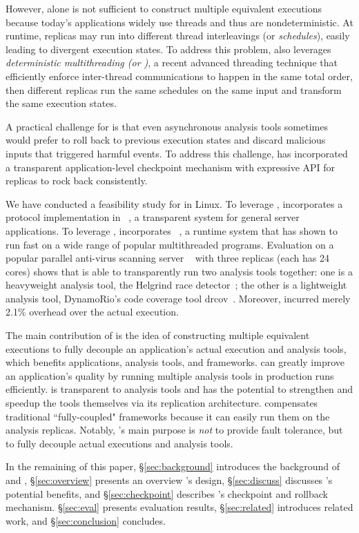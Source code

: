 However, \smr alone is not sufficient to construct multiple equivalent 
executions because today's applications widely use threads and thus are 
nondeterministic. At runtime, replicas may run into different thread
interleavings (or \emph{schedules}), easily leading to divergent execution
states. To address this problem, \xxx also leverages \emph{deterministic
multithreading (or \dmt)}, a recent advanced threading technique that
efficiently enforce inter-thread communications to happen in the same total
order, then different replicas run the same schedules on the same input and
transform the same execution states.


A practical challenge for \xxx is that even asynchronous analysis tools
sometimes would prefer to roll back to previous execution states and discard 
malicious inputs that triggered harmful events. To address this challenge, \xxx 
has incorporated a transparent application-level checkpoint mechanism with 
expressive API for replicas to rock back consistently.


We have conducted a feasibility study for \xxx in Linux. To leverage \smr, \xxx 
incorporates a \paxos protocol implementation in \repbox~\cite{repbox:sosp15}, 
a transparent \smr system for general server applications. To leverage \dmt, 
\xxx incorporates \parrot~\cite{parrot:sosp13}, a \dmt runtime system that has 
shown to run fast on a wide range of popular multithreaded programs. Evaluation 
on a popular parallel anti-virus scanning server \clamav~\cite{clamav} with 
three replicas (each has 24 cores) shows that \xxx is able to transparently run 
two analysis tools together: one is a heavyweight analysis tool, the Helgrind 
race detector~\cite{valgrind:pldi}; the other is a lightweight analysis tool, 
DynamoRio's code coverage tool drcov~\cite{dynamorio}. Moreover, \xxx incurred 
merely 2.1\% overhead over the actual execution.


The main contribution of \xxx is the idea of constructing multiple equivalent
executions to fully decouple an application's actual execution and analysis
tools, which benefits applications, analysis tools, and frameworks. \xxx can
greatly improve an application's quality by running multiple analysis tools in
production runs efficiently. \xxx is transparent to analysis tools and has the
potential to strengthen and speedup the tools themselves via its replication 
architecture. \xxx compensates traditional ``fully-coupled" frameworks because 
it can easily run them on the analysis replicas. Notably, \xxx's main purpose 
is \emph{not} to provide fault tolerance, but to fully decouple actual 
executions and analysis tools.


In the remaining of this paper, \S\ref{sec:background} introduces the 
background of \smr and \dmt, \S\ref{sec:overview} presents an overview \xxx's 
design, \S\ref{sec:discuss} discusses \xxx's potential benefits, and 
\S\ref{sec:checkpoint} describes \xxx's checkpoint and rollback mechanism. 
\S\ref{sec:eval} presents evaluation results, \S\ref{sec:related} introduces 
related work, and \S\ref{sec:conclusion} concludes.